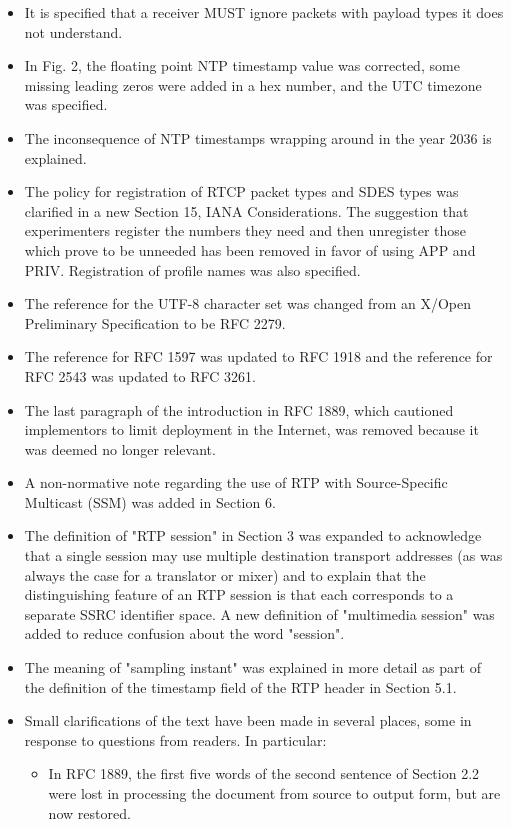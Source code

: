 \documentclass{article}
\begin{document}
\begin{itemize}
\item It is specified that a receiver MUST ignore packets with payload types it does not understand.
\item In Fig. 2, the floating point NTP timestamp value was corrected, some missing leading zeros were added in a hex number, and the UTC timezone was specified.
\item The inconsequence of NTP timestamps wrapping around in the year 2036 is explained.
\item The policy for registration of RTCP packet types and SDES types was clarified in a new Section 15, IANA Considerations.  The suggestion that experimenters register the numbers they need and then unregister those which prove to be unneeded has been removed in favor of using APP and PRIV.  Registration of profile names was also specified.
\item The reference for the UTF-8 character set was changed from an X/Open Preliminary Specification to be RFC 2279.
\item The reference for RFC 1597 was updated to RFC 1918 and the reference for RFC 2543 was updated to RFC 3261.
\item The last paragraph of the introduction in RFC 1889, which cautioned implementors to limit deployment in the Internet, was removed because it was deemed no longer relevant.
\item A non-normative note regarding the use of RTP with Source-Specific Multicast (SSM) was added in Section 6.
\item The definition of "RTP session" in Section 3 was expanded to acknowledge that a single session may use multiple destination transport addresses (as was always the case for a translator or mixer) and to explain that the distinguishing feature of an RTP session is that each corresponds to a separate SSRC identifier space.  A new definition of "multimedia session" was added to reduce confusion about the word "session".
\item The meaning of "sampling instant" was explained in more detail as part of the definition of the timestamp field of the RTP header in Section 5.1.
\item Small clarifications of the text have been made in several places, some in response to questions from readers.  In particular:
\begin{itemize}
\item In RFC 1889, the first five words of the second sentence of Section 2.2 were lost in processing the document from source to output form, but are now restored.

\end{itemize}
\end{itemize}
\end{document}
